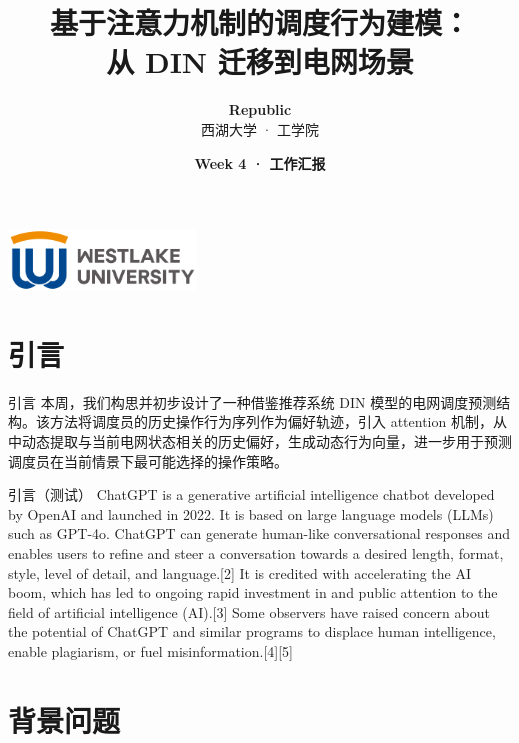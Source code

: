 \documentclass[11pt]{beamer}
\title{\textbf{基于注意力机制的调度行为建模：\\从 DIN 迁移到电网场景}}
\author[Republic]{\textbf{Republic}\\{\small 西湖大学 · 工学院}}
\institute[]{\textit{Westlake University} \\ \vspace{0.2em} Department of Computer Science and Technology}
\date{\textbf{Week 4 · 工作汇报}}
\begin{document}

\begin{frame}
\titlepage
\begin{center}
  \includegraphics[width=5cm]{./pic/logo3.png}
\end{center}
\end{frame}


\section{引言}

\begin{frame}{引言}
 本周，我们构思并初步设计了一种借鉴推荐系统 DIN 模型的电网调度预测结构。该方法将调度员的历史操作行为序列作为偏好轨迹，引入 attention 机制，从中动态提取与当前电网状态相关的历史偏好，生成动态行为向量，进一步用于预测调度员在当前情景下最可能选择的操作策略。
\end{frame}


\begin{frame}{引言（测试）}
  ChatGPT is a generative artificial intelligence chatbot developed by OpenAI and launched in 2022. It is based on large language models (LLMs) such as GPT-4o. ChatGPT can generate human-like conversational responses and enables users to refine and steer a conversation towards a desired length, format, style, level of detail, and language.[2] It is credited with accelerating the AI boom, which has led to ongoing rapid investment in and public attention to the field of artificial intelligence (AI).[3] Some observers have raised concern about the potential of ChatGPT and similar programs to displace human intelligence, enable plagiarism, or fuel misinformation.[4][5]

 \end{frame}



\section{背景问题}
\end{document}
